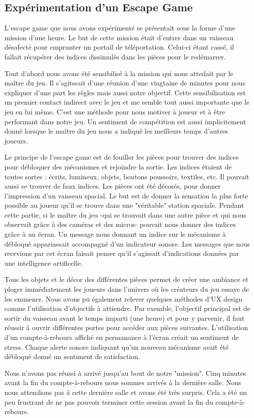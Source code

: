 \documentclass{article}
\begin{document}
	\subsection{Expérimentation d'un Escape Game}\label{sec:expescape}
		L'escape game que nous avons expérimenté se présentait sous la forme d'une mission d'une heure.
		Le but de cette mission était d'entrer dans un vaisseau désafecté pour emprunter un portail de téléportation.
		Celui-ci étant cassé, il fallait récupérer des indices dissimulés dans les pièces pour le redémarrer.\par
		Tout d'abord nous avons été sensibilisé à la mission qui nous attedait par le maître du jeu. 
		Il s'agitssait d'une réunion d'une vingtaine de minutes pour nous expliquer d'une part les règles mais aussi notre objectif.
		Cette sensibilisation est un premier contact indirect avec le jeu et me semble tout aussi importante que le jeu en lui même.
		C'est une méthode pour nous motiver à joueur et à être performant dans notre jeu.
		Un sentiment de compétition est aussi implicitement donné lorsque le maître du jeu nous a indiqué les meilleurs temps d'autres joueurs.\par
		Le principe de l'escape game est de fouiller les pièces pour trouver des indices pour débloquer des mécanismes et rejoindre la sortie.
		Les indices étaient de toutes sortes : écrits, lumineux, objets, boutons poussoirs, textiles, etc.
		Il pouvait aussi se trouver de faux indices.
		Les pièces ont été décorés, pour donner l'impression d'un vaisseau spacial.
		Le but est de donner la sensation la plus forte possible au joueur qu'il se trouve dans une "véritable" station spaciale.
		Pendant cette partie, si le maître du jeu -qui se trouvait dans une autre pièce et qui nous observait grâce à des caméras et des micros- pouvait nous donner des indices grâce à un écran.
		Un message nous donnant un indice sur le mécanisme à débloqué appariassait accompagné d'un indicateur sonore.
		Les messages que nous recevions par cet écran faisait penser qu'il s'agissait d'indications données par une intelligence artificelle.\par
		Tous les objets et le décor des différentes pièces permet de créer une ambiance et ploger immédiatement les joueurs dans l'univers où les créateurs du jeu essaye de les emmener.
		Nous avons pu également relever quelques méthodes d'UX design comme l'utilisation d'objectifs à attiendre.
		Par exemble, l'objectif principal est de sortir du vaisseau avant le temps imparti (une heure) et pour y parvenir, il faut réussir à ouvrir différentes portes pour accéder aux pièces suivantes.
		L'utilisation d'un compte-à-rebours affiché en permanance à l'écran créait un sentiment de stress.
		Chaque alerte sonore indiquant qu'un nouveau mécanisme avait été débloqué donné un sentiment de satisfaction.\par
		Nous n'avons pas réussi à arrivé jusqu'au bout de notre "mission". Cinq minutes avant la fin du compte-à-rebours nous sommes arrivés à la dernière salle.
		Nous nous attendions pas à cette dernière salle et avons été très surpris.
		Cela a été un peu frustrant de ne pas pouvoir terminer cette session avant la fin du compte-à-rebours.
\end{document}
